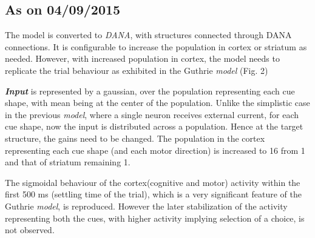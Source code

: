 \documentclass[11pt]{article}
\begin{document}
\subsection{As on 04/09/2015}
The model is converted to \emph{DANA}, with structures connected through DANA connections. It is configurable to increase the population in cortex or striatum as needed. However, with increased population in cortex, the model needs to replicate the trial behaviour as exhibited in the Guthrie \emph{model} (Fig. 2)  \par
\textbf{\emph{Input}} is represented by a gaussian, over the population representing each cue shape, with mean being at the center of the population. Unlike the simplistic case in the previous \emph{model}, where a single neuron receives external current, for each cue shape, now the input is distributed across a population. Hence at the target structure, the gains need to be changed. The population in the cortex representing each cue shape (and each motor direction) is increased to 16 from 1 and that of striatum remaining 1.
\par
The sigmoidal behaviour of the cortex(cognitive and motor) activity within the first 500 ms (settling time of the trial), which is a very significant feature of the Guthrie \emph{model}, is reproduced. However the later stabilization of the activity representing both the cues, with higher activity implying selection of a choice, is not observed.
\end{document}
